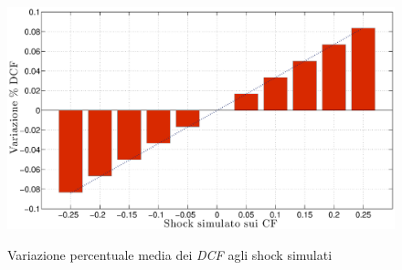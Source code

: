 \begin{figure}[htbp]
\begin{center}
{\includegraphics[scale=0.40]{Grafici/Terzo/varvcf.eps}}
\caption[Variazione media \% dei \textit{DCF} vs $\Delta$ di \textit{CF}]{Variazione percentuale media dei \textit{DCF} agli shock simulati}
\label{graf:varvcf}
\end{center}
\end{figure}